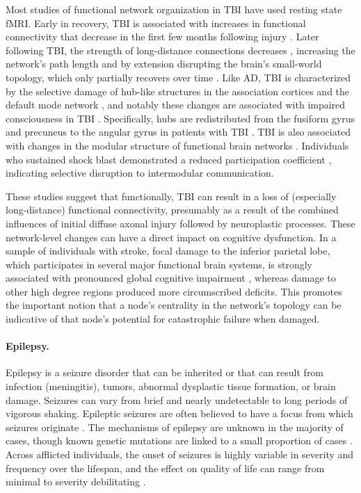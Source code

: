 \documentclass[12pt]{article}
\begin{document}
Most studies of functional network organization in TBI have used resting state fMRI. Early in recovery, TBI is associated with increases in functional connectivity that decrease in the first few months following injury \cite{hillary2015hyperconnectivity}. Later following TBI, the strength of long-distance connections decreases \cite{messe2013specific,nakamura2009resting}, increasing the network's path length and by extension disrupting the brain's small-world topology, which only partially recovers over time \cite{han2014disrupted,achard2012hubs}. Like AD, TBI is characterized by the selective damage of hub-like structures in the association cortices and the default mode network \cite{pandit2013traumatic,achard2012hubs}, and notably these changes are associated with impaired consciousness in TBI \cite{achard2012hubs}. Specifically, hubs are redistributed from the fusiform gyrus and precuneus to the angular gyrus in patients with TBI \cite{achard2012hubs}. TBI is also associated with changes in the modular structure of functional brain networks \cite{messe2013specific,han2014disrupted}. Individuals who sustained shock blast demonstrated a reduced participation coefficient \cite{han2014disrupted}, indicating selective disruption to intermodular communication. 

These studies suggest that functionally, TBI can result in a loss of (especially long-distance) functional connectivity, presumably as a result of the combined influences of initial diffuse axonal injury followed by neuroplastic processes. These network-level changes can have a direct impact on cognitive dysfunction. In a sample of individuals with stroke, focal damage to the inferior parietal lobe, which participates in several major functional brain systems, is strongly associated with pronounced global cognitive impairment \cite{Warren2014}, whereas damage to other high degree regions produced more circumscribed deficits. This promotes the important notion that a node's centrality in the network's topology can be indicative of that node's potential for catastrophic failure when damaged.

\paragraph{Epilepsy.}

Epilepsy is a seizure disorder that can be inherited or that can result from infection (meningitis), tumors, abnormal dysplastic tissue formation, or brain damage. Seizures can vary from brief and nearly undetectable to long periods of vigorous shaking. Epileptic seizures are often believed to have a focus from which seizures originate \cite{hader2013complications}. The mechanisms of epilepsy are unknown in the majority of cases, though known genetic mutations are linked to a small proportion of cases \cite{pandolfo2011genetics}. Across afflicted individuals, the onset of seizures is highly variable in severity and frequency over the lifespan, and the effect on quality of life can range from minimal to severity debilitating \cite{tellez2005long}.
\end{document}
